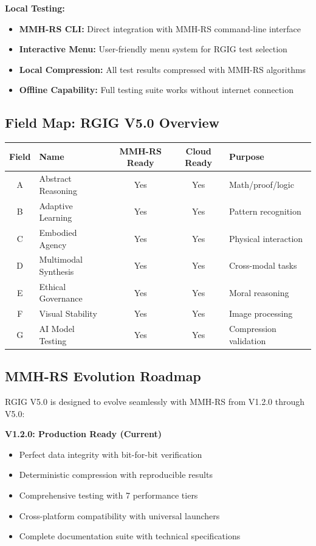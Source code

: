 \documentclass[11pt]{article}
\begin{document}
\textbf{Local Testing:}
\begin{itemize}
  \item \textbf{MMH-RS CLI:} Direct integration with MMH-RS command-line interface
  \item \textbf{Interactive Menu:} User-friendly menu system for RGIG test selection
  \item \textbf{Local Compression:} All test results compressed with MMH-RS algorithms
  \item \textbf{Offline Capability:} Full testing suite works without internet connection
\end{itemize}

\subsection*{Field Map: RGIG V5.0 Overview}
\begin{center}
\begin{tabular}{|c|l|c|c|l|}
\hline
Field & Name & MMH-RS Ready & Cloud Ready & Purpose \\
\hline
A & Abstract Reasoning & Yes & Yes & Math/proof/logic \\
B & Adaptive Learning & Yes & Yes & Pattern recognition \\
C & Embodied Agency & Yes & Yes & Physical interaction \\
D & Multimodal Synthesis & Yes & Yes & Cross-modal tasks \\
E & Ethical Governance & Yes & Yes & Moral reasoning \\
F & Visual Stability & Yes & Yes & Image processing \\
G & AI Model Testing & Yes & Yes & Compression validation \\
\hline
\end{tabular}
\end{center}

\subsection*{MMH-RS Evolution Roadmap}
RGIG V5.0 is designed to evolve seamlessly with MMH-RS from V1.2.0 through V5.0:

\textbf{V1.2.0: Production Ready (Current)}
\begin{itemize}
  \item Perfect data integrity with bit-for-bit verification
  \item Deterministic compression with reproducible results
  \item Comprehensive testing with 7 performance tiers
  \item Cross-platform compatibility with universal launchers
  \item Complete documentation suite with technical specifications
\end{itemize}
\end{document}
